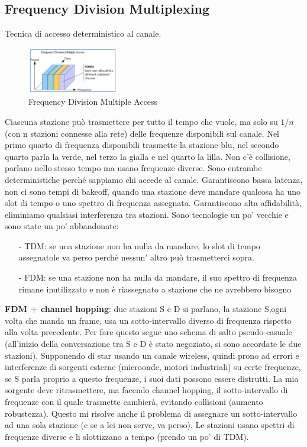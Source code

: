 \documentclass[12pt,italian]{report}
\begin{document}
\subsection{Frequency Division Multiplexing}
Tecnica di accesso deterministico al canale.
\begin{figure}[h]
\centering
\includegraphics[width=40mm]{img/FDM.PNG}
\caption{Frequency Division Multiple Access}
\label{fig:fdma}
\end{figure}
Ciascuna stazione può trasmettere per tutto il tempo che vuole, ma solo su $1/n$ (con n stazioni connesse alla rete) delle frequenze disponibili sul canale. Nel primo quarto di frequenza disponibili trasmette la stazione blu, nel secondo quarto parla la verde, nel terzo la gialla e nel quarto la lilla. Non c'è collisione, parlano nello stesso tempo ma usano frequenze diverse.  
\bigbreak
Sono entrambe deterministiche perché sappiamo chi accede al canale. Garantiscono bassa latenza, non ci sono tempi di bakeoff, quando una stazione deve mandare qualcosa ha uno slot di tempo o uno spettro di frequenza assegnata. Garantiscono alta affidabilità, eliminiamo qualsiasi interferenza tra stazioni. 
\bigbreak
Sono tecnologie un po' vecchie e sono state un po' abbandonate:
\begin{itemize}
    \item [-] TDM: se una stazione non ha nulla da mandare, lo slot di tempo assegnatole va perso perché nessun' altro può trasmetterci sopra.
    \item [-] FDM: se una stazione non ha nulla da mandare, il suo spettro di frequenza rimane inutilizzato e non è riassegnato a stazione che ne avrebbero bisogno
\end{itemize}
\noindent \textbf{FDM + channel hopping}: due stazioni S e D si parlano, la stazione S,ogni volta che manda un frame, usa un sotto-intervallo diverso di frequenza rispetto alla volta precedente. Per fare questo segue uno schema di salto pseudo-casuale (all'inizio della conversazione tra S e D è stato negoziato, si sono accordate le due stazioni). Supponendo di star usando un canale wireless, quindi prono ad errori e interferenze di sorgenti esterne (microonde, motori industriali) su certe frequenze, se S parla proprio a questo frequenze, i suoi dati possono essere distrutti. La mia sorgente deve ritrasmettere, ma facendo channel hopping, il sotto-intervallo di frequenze con il quale trasmette cambierà, evitando collisioni (aumento robustezza). Questo mi risolve anche il problema di assegnare un sotto-intervallo ad una sola stazione (e se a lei non serve, va perso). Le stazioni usano spettri di frequenze diverse e li slottizzano a tempo (prendo un po' di TDM). 
\end{document}
